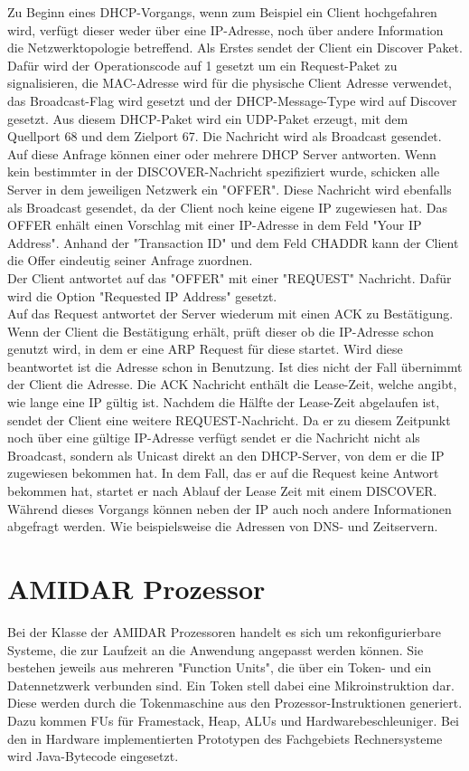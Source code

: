 Zu Beginn eines DHCP-Vorgangs, wenn zum Beispiel ein Client hochgefahren wird, verfügt dieser weder über eine IP-Adresse, noch über andere Information die Netzwerktopologie betreffend. Als Erstes sendet der Client ein Discover Paket. Dafür wird der Operationscode auf 1 gesetzt um ein Request-Paket zu signalisieren, die MAC-Adresse wird für die physische Client Adresse verwendet, das Broadcast-Flag wird gesetzt und der DHCP-Message-Type wird auf Discover gesetzt. Aus diesem DHCP-Paket wird ein UDP-Paket erzeugt, mit dem Quellport  68 und dem Zielport 67. Die Nachricht wird als Broadcast gesendet. \\
Auf diese Anfrage können einer oder mehrere DHCP Server antworten. Wenn kein bestimmter in der DISCOVER-Nachricht spezifiziert wurde, schicken alle Server in dem jeweiligen Netzwerk ein "{}OFFER". Diese Nachricht wird ebenfalls als Broadcast gesendet, da der Client noch keine eigene IP zugewiesen hat. Das OFFER enhält einen Vorschlag mit einer IP-Adresse in dem Feld "Your IP Address". Anhand der "Transaction ID"{} und dem Feld CHADDR kann der Client die Offer eindeutig seiner Anfrage zuordnen. \\
Der Client antwortet auf das "{}OFFER"{} mit einer {}"REQUEST"{} Nachricht. Dafür wird die Option "Requested IP Address"{} gesetzt. \\
Auf das Request antwortet der Server wiederum mit einen ACK zu Bestätigung. Wenn der Client die Bestätigung erhält, prüft dieser ob die IP-Adresse schon genutzt wird, in dem er eine ARP Request für diese startet. Wird diese beantwortet ist die Adresse schon in Benutzung. Ist dies nicht der Fall übernimmt der Client die Adresse. 
Die ACK Nachricht enthält die Lease-Zeit, welche angibt, wie lange eine IP gültig ist. 
Nachdem die Hälfte der Lease-Zeit abgelaufen ist, sendet der Client eine weitere REQUEST-Nachricht. Da er zu diesem Zeitpunkt noch über eine gültige IP-Adresse verfügt sendet er die Nachricht nicht als Broadcast, sondern als Unicast direkt an den DHCP-Server, von dem er die IP zugewiesen bekommen hat. In dem Fall, das er auf die Request keine Antwort bekommen hat, startet er nach Ablauf der Lease Zeit mit einem DISCOVER.\\
Während dieses Vorgangs können neben der IP auch noch andere Informationen abgefragt werden. Wie beispielsweise die Adressen von DNS- und Zeitservern.





\section{AMIDAR Prozessor}
Bei der Klasse der AMIDAR Prozessoren handelt es sich um rekonfigurierbare Systeme, die zur Laufzeit an die Anwendung angepasst werden können. Sie bestehen jeweils aus mehreren {}"Function Units"{}, die über ein Token- und ein Datennetzwerk verbunden sind. Ein Token stell dabei eine Mikroinstruktion dar. Diese werden durch die Tokenmaschine aus den Prozessor-Instruktionen generiert. Dazu kommen FUs für Framestack, Heap, ALUs und Hardwarebeschleuniger. Bei den in Hardware implementierten Prototypen des Fachgebiets Rechnersysteme wird Java-Bytecode eingesetzt.
